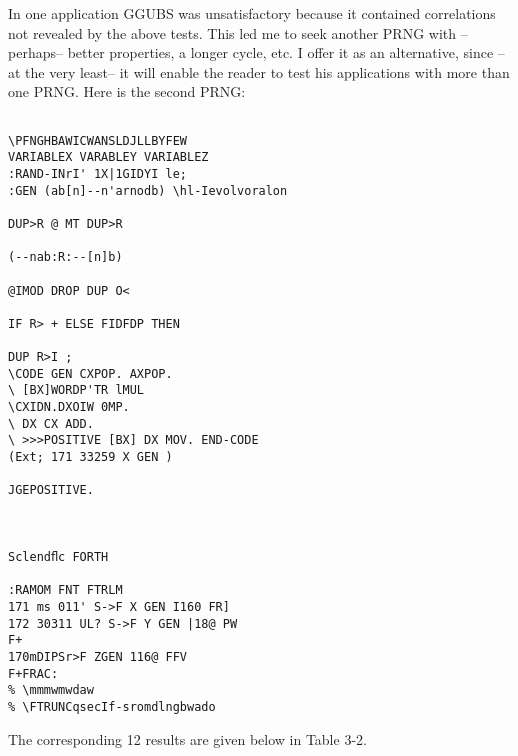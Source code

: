 

 

 

In one application GGUBS was unsatisfactory because it contained correlations
not revealed by the above tests. This led me
to seek another PRNG with --perhaps-- better properties, a
longer cycle, etc. I offer it as an alternative, since --at the very
least-- it will enable the reader to test his applications with more
than one PRNG. Here is the second PRNG:

\begin{verbatim}

\PFNGHBAWICWANSLDJLLBYFEW
VARIABLEX VARABLEY VARIABLEZ
:RAND-INrI' 1X|1GIDYI le;
:GEN (ab[n]--n'arnodb) \hl-Ievolvoralon

DUP>R @ MT DUP>R

(--nab:R:--[n]b)

@IMOD DROP DUP O<

IF R> + ELSE FIDFDP THEN

DUP R>I ;
\CODE GEN CXPOP. AXPOP.
\ [BX]WORDP'TR lMUL
\CXIDN.DXOIW 0MP.
\ DX CX ADD.
\ >>>POSITIVE [BX] DX MOV. END-CODE
(Ext; 171 33259 X GEN )

JGEPOSITIVE.

 

Sclendﬂc FORTH

:RAMOM FNT FTRLM
171 ms 011' S->F X GEN I160 FR]
172 30311 UL? S->F Y GEN |18@ PW
F+
170mDIPSr>F ZGEN 116@ FFV
F+FRAC:
% \mmmwmwdaw
% \FTRUNCqsecIf-sromdlngbwado
\end{verbatim}
The corresponding 12 results are given below in Table 3-2.


